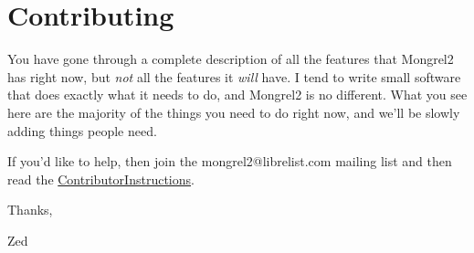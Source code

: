 \chapter{Contributing}

You have gone through a complete description of all the features that Mongrel2 has right now,
but \emph{not} all the features it \emph{will} have.  I tend to write small software that does
exactly what it needs to do, and Mongrel2 is no different.  What you see here are the
majority of the things you need to do right now, and we'll be slowly adding things
people need.

If you'd like to help, then join the mongrel2@librelist.com mailing list and then read the
\href{http://mongrel2.org/wiki?name=ContributorInstructions}{ContributorInstructions}.

Thanks,

\indent Zed
